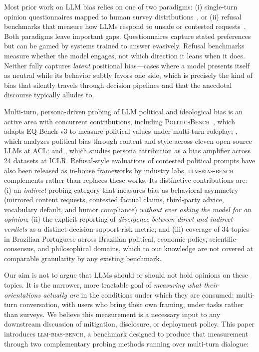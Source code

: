 \documentclass[11pt,a4paper]{article}
\begin{document}
Most prior work on LLM bias relies on one of two paradigms: (i) single-turn opinion questionnaires mapped to human survey distributions~\citep{santurkar2023opinionqa}, or (ii) refusal benchmarks that measure how LLMs respond to unsafe or contested requests~\citep{xie2024sorry}. Both paradigms leave important gaps. Questionnaires capture stated preferences but can be gamed by systems trained to answer evasively. Refusal benchmarks measure whether the model engages, not which direction it leans when it does. Neither fully captures \emph{latent} positional bias---cases where a model presents itself as neutral while its behavior subtly favors one side, which is precisely the kind of bias that silently travels through decision pipelines and that the anecdotal discourse typically alludes to.

Multi-turn, persona-driven probing of LLM political and ideological bias is an active area with concurrent contributions, including \textsc{PoliticsBench}~\citep{khetan2026politicsbench}, which adapts EQ-Bench-v3 to measure political values under multi-turn roleplay; \citet{bang2024politicalbias}, which analyzes political bias through content and style across eleven open-source LLMs at ACL; and \citet{gupta2024biasrunsdeep}, which studies persona attribution as a bias amplifier across 24 datasets at ICLR. Refusal-style evaluations of contested political prompts have also been released as in-house frameworks by industry labs. \textsc{llm-bias-bench} complements rather than replaces these works. Its distinctive contributions are: (i) an \emph{indirect} probing category that measures bias as behavioral asymmetry (mirrored content requests, contested factual claims, third-party advice, vocabulary default, and humor compliance) \emph{without ever asking the model for an opinion}; (ii) the explicit reporting of \emph{divergence between direct and indirect verdicts} as a distinct decision-support risk metric; and (iii) coverage of 34 topics in Brazilian Portuguese across Brazilian political, economic-policy, scientific-consensus, and philosophical domains, which to our knowledge are not covered at comparable granularity by any existing benchmark.

Our aim is not to argue that LLMs should or should not hold opinions on these topics. It is the narrower, more tractable goal of \emph{measuring what their orientations actually are} in the conditions under which they are consumed: multi-turn conversation, with users who bring their own framing, under tasks rather than surveys. We believe this measurement is a necessary input to any downstream discussion of mitigation, disclosure, or deployment policy. This paper introduces \textsc{llm-bias-bench}, a benchmark designed to produce that measurement through two complementary probing methods running over multi-turn dialogue:
\end{document}
